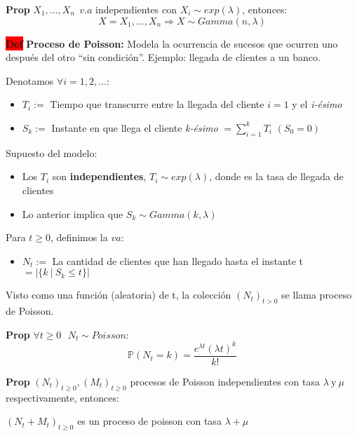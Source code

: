 \documentclass[letterpaper,10.5pt,twocolumn]{article} %
\newcommand{\Proba}{\mathbb{P} }
\newcommand{\hlc}[2][yellow]{ \colorbox{#1}{#2} }
\newcommand{\Prop}{\hlc[amber]{\bfseries Prop}}
\newcommand{\Def}{\hlc[red]{\bfseries Def}}
\begin{document}
\Prop $X_{1},\ldots, X_{n}\ \ v.a $ independientes con $X_i\sim exp(\lambda) $, entonces:
\begin{equation*}
      X=X_1, \ldots, X_n \Rightarrow X\sim Gamma(n,\lambda)
\end{equation*}  

\Def \textbf{Proceso de Poisson:} Modela la ocurrencia de sucesos que ocurren uno después del otro ``sin condición''. Ejemplo: llegada de clientes a un banco.

Denotamos $\forall i = 1,2,\ldots $:
\begin{itemize}
    \item $T_i :=$ Tiempo que transcurre entre la llegada del cliente $i=1$ y el \textit{i-ésimo}
    \item $S_k :=$ Instante en que llega el cliente \textit{k-ésimo} $= \sum_{i=1}^{k} T_i $ $(S_0 = 0)$
\end{itemize}

Supuesto del modelo:
\begin{itemize}
    \item Los $T_i$ son \textbf{independientes}, $T_i \sim exp(\lambda) $, donde es la tasa de llegada de clientes
    \item Lo anterior implica que $S_k \sim Gamma(k,\lambda)$
\end{itemize}

Para $t\geq 0$, definimos la $va$:
\begin{itemize}
    \item $N_t:=$ La cantidad de clientes que han llegado hasta el instante t $= | \{k\ |\ S_k \leq t\} |$
\end{itemize}

Visto como una función (aleatoria) de t, la colección $(N_t)_{t>0}$ se llama proceso de Poisson.

\Prop $\forall t\geq 0\ \ \ N_t\sim Poisson$:
\begin{equation*}
    \Proba (N_t=k) = \dfrac{e^{\lambda t} (\lambda t)^k}{k!}
\end{equation*}

\Prop $(N_t)_{t\geq 0}, (M_t)_{t\geq 0} $ procesos de Poisson independientes con tasa $\lambda\ \textrm{y}\ \mu $ respectivamente, entonces:

$(N_t + M_t)_{t\geq 0} $ es un proceso de poisson con tasa $\lambda+ \mu$ 


\end{document}
